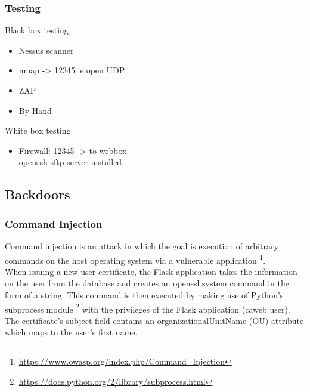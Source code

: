 \documentclass[english]{article}
\begin{document}
\subsubsection{Testing}

Black box testing
\begin{itemize}
	
	\item Nessus scanner
	\item nmap -> 12345 is open UDP
	\item ZAP
	\item By Hand

\end{itemize}

White box testing

\begin{itemize}
	\item Firewall: 12345 -> to webbox\\ openssh-sftp-server installed,  
\end{itemize}



\subsection{Backdoors}


\subsubsection{Command Injection}
Command injection is an attack in which the goal is execution of arbitrary commands on the host operating system via a vulnerable application \footnote{\url{https://www.owasp.org/index.php/Command_Injection}}.\\
 When issuing a new user certificate, the Flask application takes the information on the user from the database and creates an openssl system command in the form of a string. This command is then executed by making use of Python's subprocess module \footnote{\url{https://docs.python.org/2/library/subprocess.html}} with the privileges of the Flask application (caweb user). The certificate's subject field contains an organizationalUnitName (OU) attribute which maps to the user's first name. 
 
\end{document}
